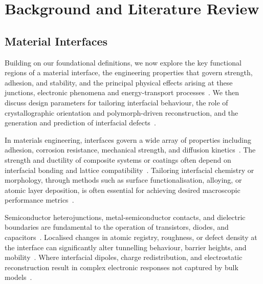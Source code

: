 \chapter{Background and Literature Review} \label{chapter:background}

\section{Material Interfaces} \label{section:material_interfaces}

\label{interface_section_intro} Building on our foundational definitions, we now explore the key functional regions of a material interface, the engineering properties that govern strength, adhesion, and stability, and the principal physical effects arising at these junctions, electronic phenomena and energy-transport processes~\nocite{}.
We then discuss design parameters for tailoring interfacial behaviour, the role of crystallographic orientation and polymorph-driven reconstruction, and the generation and prediction of interfacial defects~\nocite{}.

\label{interfacial_engineering_properties} In materials engineering, interfaces govern a wide array of properties including adhesion, corrosion resistance, mechanical strength, and diffusion kinetics~\cite{Leitherer2023-ew, Butler2019-ws}.
The strength and ductility of composite systems or coatings often depend on interfacial bonding and lattice compatibility~\cite{Lorentzon2025-si, Raabe2020-ra}.
Tailoring interfacial chemistry or morphology, through methods such as surface functionalisation, alloying, or atomic layer deposition, is often essential for achieving desired macroscopic performance metrics~\cite{Chagarov2015-ol, Leitherer2023-ew, Butler2019-ws}.

\newpage \label{electronic_interface_effects} %
Semiconductor heterojunctions, metal-semiconductor contacts, and dielectric boundaries are fundamental to the operation of transistors, diodes, and capacitors~\cite{Low2025-on, Khot2025-hh}.
Localised changes in atomic registry, roughness, or defect density at the interface can significantly alter tunnelling behaviour, barrier heights, and mobility~\cite{Gerber2023-yd, Khot2025-hh}.
Where interfacial dipoles, charge redistribution, and electrostatic reconstruction result in complex electronic responses not captured by bulk models~\cite{Alam2020-ci}.

